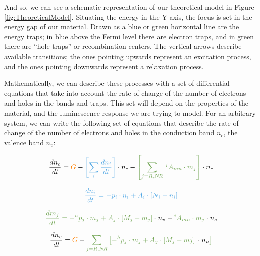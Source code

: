 And so, we can see a schematic representation of our theoretical model in Figure \ref{fig:TheoreticalModel}. Situating the energy in the Y axis, the focus is set in the energy gap of our material. Drawn as a blue or green horizontal line are the energy traps; in blue above the Fermi level there are electron traps, and in green there are ``hole traps'' or recombination centers. The vertical arrows describe available transitions; the ones pointing upwards represent an excitation process, and the ones pointing downwards represent a relaxation process. 

\vspace{10pt}

Mathematically, we can describe these processes with a set of differential equations that take into account the rate of change of the number of electrons and holes in the bands and traps. This set will depend on the properties of the material, and the luminescence response we are trying to model. For an arbitrary system, we can write the following set of equations that describe the rate of change of the number of electrons and holes in the conduction band $n_c$, the valence band $n_v$:
\vspace{10pt}

\begin{equation} \label{eq:dn_cdt}
  \frac{dn_c}{dt} = \textcolor{orange}{G} - \textcolor{customblue}{\left[\sum_i \frac{dn_i}{dt}\right]} \cdot n_c - \textcolor{customgreen}{\left[ \sum_{j=R, N\!R}\, ^jA_{mn} \cdot m_j \right]} \cdot n_c
\end{equation}

\begin{equation} \label{eq:dn_idt}
  \textcolor{customblue}{\frac{dn_i}{dt} = -p_i \cdot n_i + A_i \cdot [N_i - n_i]}
\end{equation}

\begin{equation} \label{eq:dm_jdt}
  \textcolor{customgreen}{\frac{dm_j}{dt} = -^hp_j \cdot m_j + A_j \cdot [M_j - m_j]} \cdot n_v - \textcolor{customgreen}{^iA_{mn} \cdot m_j} \cdot n_c
\end{equation}

\begin{equation} \label{eq:dn_vdt}
  \frac{dn_v}{dt} = \textcolor{orange}{G} - \textcolor{customgreen}{\sum_{j=R, N\!R} \left[-^hp_j \cdot m_j + A_j \cdot [M_j - mj] \textcolor{black}{~ \cdot ~n_v}\right]} 
\end{equation}

